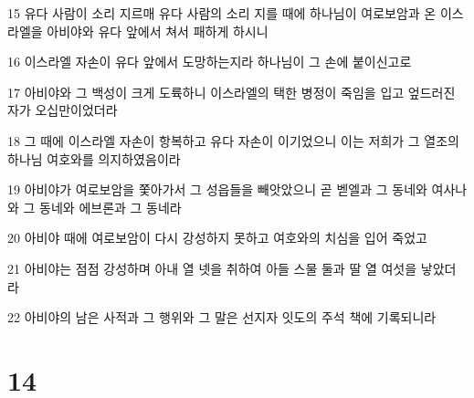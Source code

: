 \par 15 유다 사람이 소리 지르매 유다 사람의 소리 지를 때에 하나님이 여로보암과 온 이스라엘을 아비야와 유다 앞에서 쳐서 패하게 하시니
\par 16 이스라엘 자손이 유다 앞에서 도망하는지라 하나님이 그 손에 붙이신고로
\par 17 아비야와 그 백성이 크게 도륙하니 이스라엘의 택한 병정이 죽임을 입고 엎드러진 자가 오십만이었더라
\par 18 그 때에 이스라엘 자손이 항복하고 유다 자손이 이기었으니 이는 저희가 그 열조의 하나님 여호와를 의지하였음이라
\par 19 아비야가 여로보암을 쫓아가서 그 성읍들을 빼앗았으니 곧 벧엘과 그 동네와 여사나와 그 동네와 에브론과 그 동네라
\par 20 아비야 때에 여로보암이 다시 강성하지 못하고 여호와의 치심을 입어 죽었고
\par 21 아비야는 점점 강성하며 아내 열 넷을 취하여 아들 스물 둘과 딸 열 여섯을 낳았더라
\par 22 아비야의 남은 사적과 그 행위와 그 말은 선지자 잇도의 주석 책에 기록되니라

\chapter{14}

